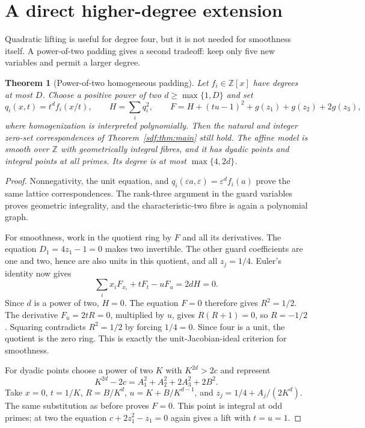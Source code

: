 \documentclass[11pt,a4paper]{article}
\newtheorem{theorem}{Theorem}[section]
\theoremstyle{definition}
\theoremstyle{remark}
\newcommand{\Z}{\mathbb Z}
\newcommand{\guard}{g}
\begin{document}
\section{A direct higher-degree extension}\label{sdf:sec:power-two}

Quadratic lifting is useful for degree four, but it is not needed for
smoothness itself. A power-of-two padding gives a second tradeoff: keep
only five new variables and permit a larger degree.

\begin{theorem}[Power-of-two homogeneous padding]\label{sdf:thm:padding}
Let $f_i\in\Z[x]$ have degrees at most $D$. Choose a positive power of
two $d\ge\max\{1,D\}$ and set
\[
 q_i(x,t)=t^d f_i(x/t),\qquad H=\sum_iq_i^2,
 \qquad F=H+(tu-1)^2+\guard(z_1)+\guard(z_2)+2\guard(z_3),
\]
where homogenization is interpreted polynomially. Then the natural and
integer zero-set correspondences of Theorem~\ref{sdf:thm:main} still hold.
The affine model is smooth over $\Z$ with geometrically integral fibres,
and it has dyadic points and integral points at all primes. Its degree is
at most $\max\{4,2d\}$.
\end{theorem}
\begin{proof}
Nonnegativity, the unit equation, and
$q_i(\varepsilon a,\varepsilon)=\varepsilon^d f_i(a)$ prove the same
lattice correspondences. The rank-three argument in the guard variables
proves geometric integrality, and the characteristic-two fibre is again
a polynomial graph.

For smoothness, work in the quotient ring by $F$ and all its derivatives.
The equation $D_1=4z_1-1=0$ makes two invertible. The other guard
coefficients are one and two, hence are also units in this quotient, and
all $z_j=1/4$. Euler's identity now gives
\[
 \sum_i x_iF_{x_i}+tF_t-uF_u=2dH=0.
\]
Since $d$ is a power of two, $H=0$. The equation $F=0$ therefore gives
$R^2=1/2$. The derivative $F_u=2tR=0$, multiplied by $u$, gives
$R(R+1)=0$, so $R=-1/2$. Squaring contradicts $R^2=1/2$ by forcing
$1/4=0$. Since four is a unit, the quotient is the zero ring. This is
exactly the unit-Jacobian-ideal criterion for smoothness.

For dyadic points choose a power of two $K$ with $K^{2d}>2c$ and represent
\[
 K^{2d}-2c=A_1^2+A_2^2+2A_3^2+2B^2.
\]
Take $x=0$, $t=1/K$, $R=B/K^d$, $u=K+B/K^{d-1}$, and
$z_j=1/4+A_j/(2K^d)$. The same substitution as before proves $F=0$.
This point is integral at odd primes; at two the equation
$c+2z_1^2-z_1=0$ again gives a lift with $t=u=1$.
\end{proof}
\end{document}
